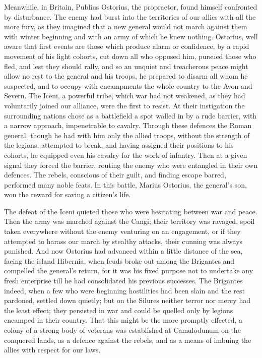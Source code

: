 
Meanwhile, in Britain, Publius Ostorius, the propraetor, found himself confronted by disturbance. The enemy had burst into the territories of our allies with all the more fury, as they imagined that a new general would not march against them with winter beginning and with an army of which he knew nothing. Ostorius, well aware that first events are those which produce alarm or confidence, by a rapid movement of his light cohorts, cut down all who opposed him, pursued those who fled, and lest they should rally, and so an unquiet and treacherous peace might allow no rest to the general and his troops, he prepared to disarm all whom he suspected, and to occupy with encampments the whole country to the Avon and Severn. The Iceni, a powerful tribe, which war had not weakened, as they had voluntarily joined our alliance, were the first to resist. At their instigation the surrounding nations chose as a battlefield a spot walled in by a rude barrier, with a narrow approach, impenetrable to cavalry. Through these defences the Roman general, though he had with him only the allied troops, without the strength of the legions, attempted to break, and having assigned their positions to his cohorts, he equipped even his cavalry for the work of infantry. Then at a given signal they forced the barrier, routing the enemy who were entangled in their own defences. The rebels, conscious of their guilt, and finding escape barred, performed many noble feats. In this battle, Marius Ostorius, the general's son, won the reward for saving a citizen's life.


The defeat of the Iceni quieted those who were hesitating between war and peace. Then the army was marched against the Cangi; their territory was ravaged, spoil taken everywhere without the enemy venturing on an engagement, or if they attempted to harass our march by stealthy attacks, their cunning was always punished. And now Ostorius had advanced within a little distance of the sea, facing the island Hibernia, when feuds broke out among the Brigantes and compelled the general's return, for it was his fixed purpose not to undertake any fresh enterprise till he had consolidated his previous successes. The Brigantes indeed, when a few who were beginning hostilities had been slain and the rest pardoned, settled down quietly; but on the Silures neither terror nor mercy had the least effect; they persisted in war and could be quelled only by legions encamped in their country. That this might be the more promptly effected, a colony of a strong body of veterans was established at Camulodunum on the conquered lands, as a defence against the rebels, and as a means of imbuing the allies with respect for our laws.


